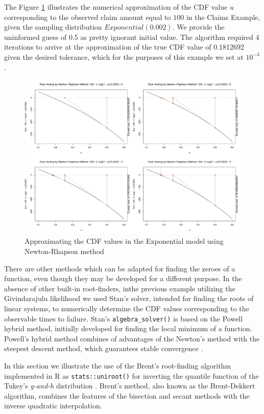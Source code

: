 \documentclass[
  12pt,
]{article}
\begin{document}
The Figure \ref{fig:newton-animation-graph} illustrates the numerical approximation of the CDF value \(u\) corresponding to the observed claim amount equal to \(100\) in the Claims Example, given the sampling distribution \(Exponential(0.002)\). We provide the uninformed guess of 0.5 as pretty ignorant initial value. The algorithm required 4 iterations to arrive at the approximation of the true CDF value of 0.1812692 given the desired tolerance, which for the purposes of this example we set at \(10^{-3}\).

\begin{figure}

{\centering \includegraphics[width=0.5\linewidth]{img/newton-graph} 

}

\caption{Approximating the CDF values in the Exponential model using Newton-Rhapson method}\label{fig:newton-animation-graph}
\end{figure}

There are other methods which can be adapted for finding the zeroes of a function, even though they may be developed for a different purpose. In the absence of other built-in root-finders, inthe previous example utilizing the Givindarajulu likelihood we used Stan's solver, intended for finding the roots of linear systems, to numerically determine the CDF values corresponding to the observable times to failure. Stan's \texttt{algebra\_solver()} is based on the Powell hybrid method, initially developed for finding the local minimum of a function. Powell's hybrid method combines of advantages of the Newton's method with the steepest descent method, which guarantees stable convergence \citep{powell1970HybridMethodNonlinear}.

In this section we illustrate the use of the Brent's root-finding algorithm implemented in R as \texttt{stats::uniroot()} for inverting the quantile function of the Tukey's \emph{g-and-h} distribution \citep{rayner2002NumericalMaximumLikelihood}. Brent's method, also known as the Brent-Dekkert algorithm, combines the features of the bisection and secant methods with the inverse quadratic interpolation.
\end{document}
